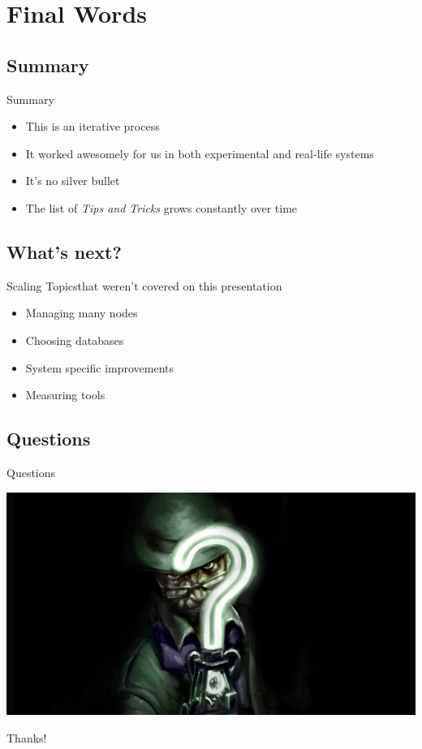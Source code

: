 \documentclass[utf8]{beamer}
\begin{document}
\section{Final Words}
\subsection{Summary}
\begin{frame}{Summary}
	\begin{itemize}
		\item<+-> This is an \alert{iterative} process
		\item<+-> It worked awesomely for us in both experimental and real-life systems
		\item<+-> It's no \alert{silver bullet}
		\item<+-> The list of \emph{Tips and Tricks} grows \alert{constantly} over time
	\end{itemize}
\end{frame}
\subsection{What's next?}
\begin{frame}{Scaling Topics}{that weren't covered on this presentation}
	\begin{itemize}
		\item Managing many nodes
		\item Choosing databases
		\item System specific improvements
		\item Measuring tools
	\end{itemize}
\end{frame}
\subsection{Questions}
\begin{frame}{Questions}
	\begin{center}
		\includegraphics[width=\textwidth]{img/theriddler.jpg}
	\end{center}
\end{frame}

\appendix

\begin{frame}
	\begin{center}
		{\Huge Thanks!}
	\end{center}
\end{frame}
\end{document}
